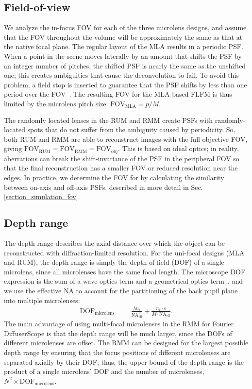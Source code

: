 \documentclass{osa-article}
\begin{document}
\subsection{Field-of-view}
\label{section_fov}
We analyze the in-focus FOV for each of the three microlens designs, and assume that the FOV throughout the volume will be approximately the same as that at the native focal plane. The regular layout of the MLA results in a periodic PSF. When a point in the scene moves laterally by an amount that shifts the PSF by an integer number of pitches, the shifted PSF is nearly the same as the unshifted one; this creates ambiguities that cause the deconvolution to fail. To avoid this problem, a field stop is inserted to guarantee that the PSF shifts by less than one period over the FOV~\cite{scrofani2018flfm,guo2019flfm}. The resulting FOV for the MLA-based FLFM is thus limited by the microlens pitch size: $ \mathrm{FOV}_\mathrm{MLA} = p / M$. 

The randomly located lenses in the RUM and RMM create PSFs with randomly-located spots that do not suffer from the ambiguity caused by periodicity. So, both RUM and RMM are able to reconstruct images with the full objective FOV, giving $ \mathrm{FOV}_\mathrm{RUM} = \mathrm{FOV}_\mathrm{RMM} = \mathrm{FOV}_\mathrm{obj}$. This is based on ideal optics; in reality, aberrations can break the shift-invariance of the PSF in the peripheral FOV so that the final reconstruction has a smaller FOV or reduced resolution near the edges. In practice, we determine the FOV for by calculating the similarity between on-axis and off-axis PSFs, described in more detail in Sec. \ref{section_simulation_fov}. 

\subsection{Depth range}
\label{section_depthrange}
The depth range describes the axial distance over which the object can be reconstructed with diffraction-limited resolution. For the uni-focal designs (MLA and RUM), the depth range is simply the depth-of-field (DOF) of a single microlens, since all microlenses have the same focal length. The microscope DOF expression is the sum of a wave optics term and a geometrical optics term~\cite{microscopyU_DOF}, and we use the effective NA to account for the partitioning of the back pupil plane into multiple microlenses:
\begin{eqnarray}
\label{eq_dof}
\mathrm{DOF_{microlens}} &=& \frac{\lambda n_r}{\text{NA}_{\text{eff}}^2} + \frac{n_r \cdot s}{M \cdot \text{NA}_{\text{eff}}}  .
\end{eqnarray}
The main advantage of using multi-focal microlenses in the RMM for Fourier DiffuserScope is that the depth range will be much larger, since the DOFs of different microlenses are offset. The RMM can be designed for the largest possible depth range by ensuring that the focus positions of different microlenses are separated axially by their DOF; thus, the upper bound of the depth range is the product of a single microlens' DOF and the number of microlenses, $N^2 \times \mathrm{ DOF_{microlens}}$.
\end{document}
